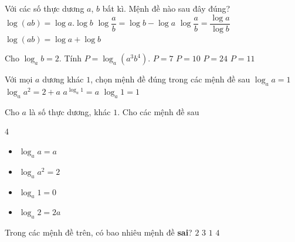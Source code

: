 \begin{ex}%
	Với các số  thực dương $a$, $b$ bất kì. Mệnh đề nào sau đây đúng?
	 \choice
		{$\log  (ab)=\log a.\log b$}
		{$\log \dfrac{a}{b}=\log b-\log a$} 
		{$\log \dfrac{a}{b}=\dfrac{\log a}{\log b}$} 
		{\True $\log (ab)=\log  a+\log b$}
\end{ex}

\begin{ex}%
	Cho $\log_a b=2$. Tính $P=\log_a\left(a^3b^4\right)$. 
	 \choice
		{$P=7$} 
		 {$P=10$}
		 {$P=24$}
		{\True  $P=11$}
\end{ex}

\begin{ex}%
	Với mọi $a$ dương khác $1$, chọn mệnh đề đúng trong các  mệnh đề sau
	 \choice
		{\True $\log _a a=1$} 
		{$\log _a a^2=2+a$} 
		{$a^{\log _a 1}=a$} 
		{$\log _a 1=1$} 
\end{ex}

\begin{ex}%
	Cho $a$ là số  thực dương, khác $1$. Cho các mệnh đề sau
	\begin{multicols}{4}
		\begin{itemize}
			\item[(I)] $\log_a  a=a$
			 \item[(II)] $\log_a a^2=2$
			\item[(III)] $\log_a 1=0$ 
			 \item[(IV)] $\log_a 2=2a$
		\end{itemize}
	\end{multicols}
	Trong các mệnh đề  trên, có bao nhiêu mệnh đề \textbf{sai}?
	 \choice
		{\True  $2$}
		{$3$} 
		 {$1$}
		 {$4$}
\end{ex}

